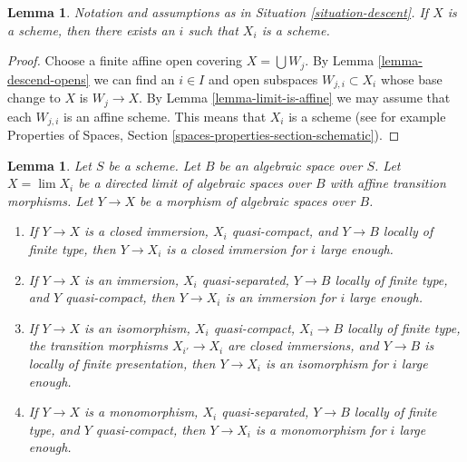\documentclass{stacks-project}
\theoremstyle{plain}
\newtheorem{lemma}[subsection]{Lemma}
\theoremstyle{definition}
\theoremstyle{remark}
\numberwithin{equation}{subsection}
\def\lim{\mathop{\mathrm{lim}}\nolimits}
\begin{document}
\begin{lemma}
\label{lemma-limit-is-scheme}
Notation and assumptions as in Situation \ref{situation-descent}.
If $X$ is a scheme, then there exists an $i$ such that $X_i$ is a scheme.
\end{lemma}

\begin{proof}
Choose a finite affine open covering $X = \bigcup W_j$.
By Lemma \ref{lemma-descend-opens}
we can find an $i \in I$ and open subspaces $W_{j, i} \subset X_i$
whose base change to $X$ is $W_j \to X$. By
Lemma \ref{lemma-limit-is-affine} we may assume that
each $W_{j, i}$ is an affine scheme. This means that $X_i$
is a scheme (see for example
Properties of Spaces, Section \ref{spaces-properties-section-schematic}).
\end{proof}

\begin{lemma}
\label{lemma-finite-type-eventually-closed}
Let $S$ be a scheme. Let $B$ be an algebraic space over $S$.
Let $X = \lim X_i$ be a directed limit of
algebraic spaces over $B$ with affine transition morphisms.
Let $Y \to X$ be a morphism of algebraic spaces over $B$.
\begin{enumerate}
\item If $Y \to X$ is a closed immersion, $X_i$ quasi-compact, and
$Y \to B$ locally of finite type, then $Y \to X_i$ is a closed immersion
for $i$ large enough.
\item If $Y \to X$ is an immersion, $X_i$ quasi-separated, $Y \to B$
locally of finite type, and $Y$ quasi-compact, then $Y \to X_i$ is an
immersion for $i$ large enough.
\item If $Y \to X$ is an isomorphism, $X_i$ quasi-compact,
$X_i \to B$ locally of finite type, the transition morphisms
$X_{i'} \to X_i$ are closed immersions, and $Y \to B$ is locally
of finite presentation, then $Y \to X_i$ is an isomorphism for $i$
large enough.
\item If $Y \to X$ is a monomorphism, $X_i$ quasi-separated,
$Y \to B$ locally of finite type, and $Y$ quasi-compact, then
$Y \to X_i$ is a monomorphism for $i$ large enough.
\end{enumerate}
\end{lemma}
\end{document}
